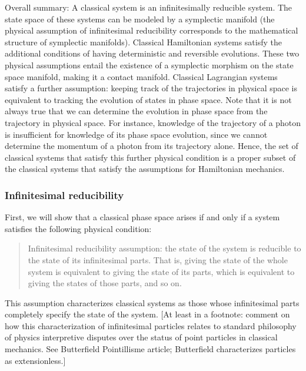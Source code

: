 \documentclass[letterpaper]{article}
\begin{document}
Overall summary: A classical system is an infinitesimally reducible system. The state space of these systems can be modeled by a symplectic manifold (the physical assumption of infinitesimal reducibility corresponds to the mathematical structure of symplectic manifolds). Classical Hamiltonian systems satisfy the additional conditions of having deterministic and reversible evolutions. These two physical assumptions entail the existence of a symplectic morphism on the state space manifold, making it a contact manifold. Classical Lagrangian systems satisfy a further assumption: keeping track of the trajectories in physical space is equivalent to tracking the evolution of states in phase space. Note that it is not always true that we can determine the evolution in phase space from the trajectory in physical space. For instance, knowledge of the trajectory of a photon is insufficient for knowledge of its phase space evolution, since we cannot determine the momentum of a photon from its trajectory alone. Hence, the set of classical systems that satisfy this further physical condition is a proper subset of the classical systems that satisfy the assumptions for Hamiltonian mechanics.

\subsubsection{Infinitesimal reducibility}

First, we will show that a classical phase space arises if and only if a system satisfies the following physical condition:

\begin{quotation}
Infinitesimal reducibility assumption: the state of the system is reducible to the state of its infinitesimal parts. That is, giving the state of the whole system is equivalent to giving the state of its parts, which is equivalent to giving the states of those parts, and so on.
\end{quotation}

\noindent
This assumption characterizes classical systems as those whose infinitesimal parts completely specify the state of the system. [At least in a footnote: comment on how this characterization of infinitesimal particles relates to standard philosophy of physics interpretive disputes over the status of point particles in classical mechanics. See Butterfield Pointillisme article; Butterfield characterizes particles as extensionless.]
\end{document}
